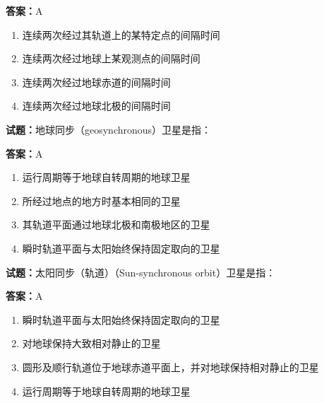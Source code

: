 \documentclass{ctexbook}
\begin{document}
\textbf{答案：}A 

\begin{enumerate}[leftmargin=3em]
  \item 连续两次经过其轨道上的某特定点的间隔时间 

  \item 连续两次经过地球上某观测点的间隔时间 

  \item 连续两次经过地球赤道的间隔时间 

  \item 连续两次经过地球北极的间隔时间 

\end{enumerate}





\vspace{1em}

\textbf{试题：}地球同步（geosynchronous）卫星是指： 

\textbf{答案：}A 

\begin{enumerate}[leftmargin=3em]
  \item 运行周期等于地球自转周期的地球卫星 

  \item 所经过地点的地方时基本相同的卫星 

  \item 其轨道平面通过地球北极和南极地区的卫星 

  \item 瞬时轨道平面与太阳始终保持固定取向的卫星 

\end{enumerate}





\vspace{1em}

\textbf{试题：}太阳同步（轨道）（Sun-synchronous orbit）卫星是指： 

\textbf{答案：}A 

\begin{enumerate}[leftmargin=3em]
  \item 瞬时轨道平面与太阳始终保持固定取向的卫星 

  \item 对地球保持大致相对静止的卫星 

  \item 圆形及顺行轨道位于地球赤道平面上，并对地球保持相对静止的卫星 

  \item 运行周期等于地球自转周期的地球卫星 

\end{enumerate}
\end{document}
